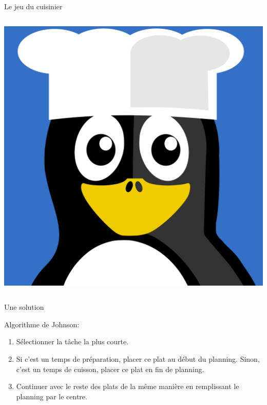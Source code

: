 \documentclass[landscape]{beamer}
\begin{document}
\begin{frame}{Le jeu du cuisinier}
\begin{columns}
\begin{column}{0.25\textwidth}
\includegraphics[width=\textwidth]{cook.pdf}
\end{column}

\end{columns}

\end{frame}


\begin{frame}{Une solution}



\begin{block}{Algorithme de Johnson:}

\begin{enumerate}
\item Sélectionner la tâche la plus courte.
\item Si c'est un temps de préparation, placer ce plat au début du planning. Sinon, c'est un temps de cuisson, placer ce plat en fin de planning.
\item Continuer avec le reste des plats de la même manière en remplissant le planning par le centre.
\end{enumerate}

\end{block}


\end{frame}
\end{document}
